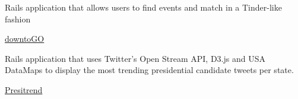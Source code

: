 \begin{cventries}
  \cventry
    { \begin{cvitems}
          \item {Rails application that allows users to find events and match in a Tinder-like fashion} 
      \end{cvitems}}
    {\color{hyperlink} \href{https://github.com/LewisMatos/DTG}{downtoGO}}
    {}
    {}
    {}
      \cventry
    {\begin{cvitems}
        \item {Rails application that uses Twitter's Open Stream API, D3.js and USA DataMaps to display the most trending presidential candidate tweets per state.}
      \end{cvitems}}
    {{\color{hyperlink} \href{https://github.com/LewisMatos/presitrend}{Presitrend}}}
    {}
    {}
    {}
\end{cventries}
